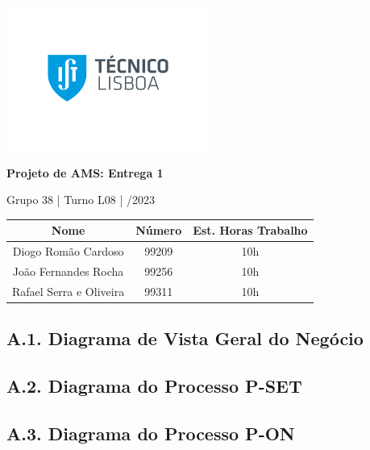 \documentclass[12pt,a4paper]{article}
\begin{document}
\begin{titlepage}
	\begin{center}

		\vspace*{0.5cm}
		\includegraphics[width=0.5\textwidth]{ist-logo.png}

		\vspace{1cm}
		\Huge
		\textbf{Projeto de AMS: Entrega 1}

		\vspace{0.5cm}
		\LARGE
		Grupo 38 \quad | \quad Turno L08 \quad | /2023

		\vfill
	\end{center}

	\large
	\begin{tabular}{c|c|c}
		\textbf{Nome}           & \textbf{Número} & \textbf{Est. Horas Trabalho} \\
		\hline
		Diogo Romão Cardoso     & 99209           & 10h                          \\
		João Fernandes Rocha    & 99256           & 10h                          \\
		Rafael Serra e Oliveira & 99311           & 10h
	\end{tabular}

	\vspace{5cm}
\end{titlepage}

\begin{landscape}
	\section*{A.1. Diagrama de Vista Geral do Negócio}
	
\end{landscape}

\begin{landscape}
	\section*{A.2. Diagrama do Processo P-SET}
	
\end{landscape}

\begin{landscape}
	\section*{A.3. Diagrama do Processo P-ON}
	
\end{landscape}
\end{document}

